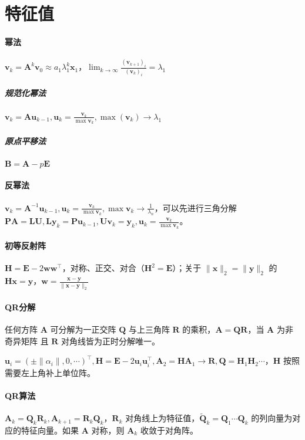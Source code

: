 \documentclass[twocolumn]{ctexart}
\begin{document}

\section{特征值}

\paragraph{幂法} $\mathbf{v}_{k}=\mathbf{A}^{k}\mathbf{v}_0\approx a_1\lambda_1^k\mathbf{x}_1$，$\lim_{k\rightarrow \infty}\frac{(\mathbf{v}_{k+1})_i}{(\mathbf{v}_k)_i}=\lambda_1$
\subparagraph{规范化幂法} $\mathbf{v}_k=\mathbf{A}\mathbf{u}_{k-1},\mathbf{u}_k=\frac{\mathbf{v}_k}{\max\mathbf{v}_k},\max(\mathbf{v}_k)\rightarrow \lambda_1$
\subparagraph{原点平移法} $\mathbf{B}=\mathbf{A}-p\mathbf{E}$

\paragraph{反幂法} $\mathbf{v}_k=\mathbf{A}^{-1}\mathbf{u}_{k-1},\mathbf{u}_k=\frac{\mathbf{v}_k}{\max\mathbf{v}_k},\max\mathbf{v}_k\rightarrow \frac{1}{\lambda_n}$，可以先进行三角分解 $\mathbf{P}\mathbf{A}=\mathbf{L}\mathbf{U}, \mathbf{L}\mathbf{y}_k=\mathbf{P}\mathbf{u}_{k-1},\mathbf{U}\mathbf{v}_k=\mathbf{y}_k,\mathbf{u}_k=\frac{\mathbf{v}_k}{\max\mathbf{v}_k}$。

\paragraph{初等反射阵} $\mathbf{H}=\mathbf{E}-2\mathbf{w}\mathbf{w}^\top$，对称、正交、对合（$\mathbf{H}^2=\mathbf{E}$）；关于 $\lVert \mathbf{x}\rVert_2=\lVert \mathbf{y}\rVert_2$ 的 $\mathbf{H}\mathbf{x}=\mathbf{y}$，$\mathbf{w}=\frac{\mathbf{x}-\mathbf{y}}{\lVert \mathbf{x}-\mathbf{y}\rVert_2}$

\paragraph{QR分解} 任何方阵 $\mathbf{A}$ 可分解为一正交阵 $\mathbf{Q}$ 与上三角阵 $\mathbf{R}$ 的乘积，$\mathbf{A}=\mathbf{Q}\mathbf{R}$，当 $\mathbf{A}$ 为非奇异矩阵 且 $\mathbf{R}$ 对角线皆为正时分解唯一。

$\mathbf{u}_i=(\pm\lVert\alpha_i\rVert,0,\cdots)^\top,\mathbf{H}=\mathbf{E}-2\mathbf{u}_i\mathbf{u}_i^\top,\mathbf{A}_2=\mathbf{H}\mathbf{A}_1\rightarrow\mathbf{R},\mathbf{Q}=\mathbf{H}_1\mathbf{H}_2\cdots$，$\mathbf{H}$ 按照需要左上角补上单位阵。

\paragraph{QR算法} $\mathbf{A}_k=\mathbf{Q}_k\mathbf{R}_k, \mathbf{A}_{k+1}=\mathbf{R}_k\mathbf{Q}_k$，$\mathbf{R}_k$ 对角线上为特征值，$\tilde{\mathbf{Q}}_k=\mathbf{Q}_1\cdots\mathbf{Q}_k$ 的列向量为对应的特征向量。如果 $\mathbf{A}$ 对称，则 $\mathbf{A}_k$ 收敛于对角阵。


\end{document}
